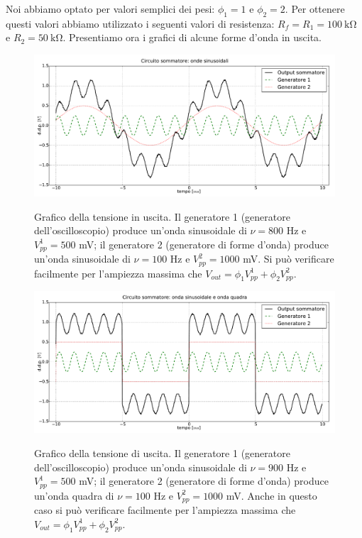 Noi abbiamo optato per valori semplici dei pesi: $\phi_1=1$ e $\phi_2=2$. Per ottenere questi valori abbiamo utilizzato i seguenti valori di resistenza: $R_f=R_1=\SI{100}{\kilo\ohm}$ e $R_2=\SI{50}{\kilo\ohm}$.
Presentiamo ora i grafici di alcune forme d'onda in uscita.

\begin{figure}[ht]
 \centering
   {\includegraphics[width=14.8cm]{../E01/latex/sinsin.pdf}}
 \caption{Grafico della tensione in uscita. Il generatore 1 (generatore dell'oscilloscopio) produce un'onda sinusoidale di $\nu=800$ \si{\hertz} e $V^1_{pp}=500$ \si{\milli\volt}; il generatore 2 (generatore di forme d'onda) produce un'onda sinusoidale di $\nu=100$ \si{\hertz} e $V^2_{pp}=1000$ \si{\milli\volt}. Si può verificare facilmente per l'ampiezza massima che $V_{out} = \phi_1 V^1_{pp}+\phi_2 V^2_{pp}$.}
 \label{gr1:onde1}
\end{figure}

\begin{figure}[ht]
 \centering
   {\includegraphics[width=14.8cm]{../E01/latex/sinquad.pdf}}
 \caption{Grafico della tensione di uscita. Il generatore 1 (generatore dell'oscilloscopio) produce un'onda sinusoidale di $\nu=900$ \si{\hertz} e $V^1_{pp}=500$ \si{\milli\volt}; il generatore 2 (generatore di forme d'onda) produce un'onda quadra di $\nu=100$ \si{\hertz} e $V^2_{pp}=1000$ \si{\milli\volt}. Anche in questo caso si può verificare facilmente per l'ampiezza massima che $V_{out} = \phi_1 V^1_{pp}+\phi_2 V^2_{pp}$.}
 \label{gr1:onde2}
\end{figure}

